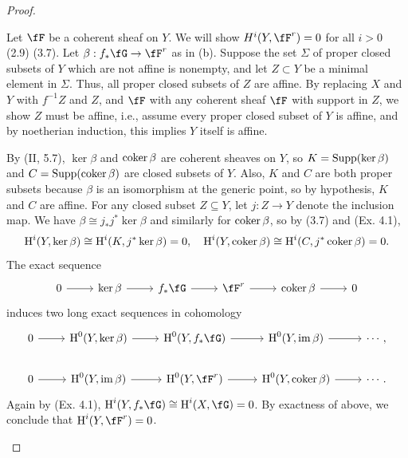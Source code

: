 \documentclass[a4paper]{article}
\begin{document}
\begin{enumerate} [label=\textbf{\arabic*.}, leftmargin=0em]
\begin{proof}
\begin{enumerate} [label=(\alph*), leftmargin=0cm]
                  Let $\fF$ be a coherent sheaf on $Y$.
                  We will show $H^i(Y, \fF^r) = 0$ for all $i > 0$ (2.9) (3.7).
                  Let $\beta : f_*\fG \to \fF^r$ as in (b).
                  Suppose the set $\Sigma$ of proper closed subsets of $Y$ which are not affine is nonempty, and let $Z \subset Y$ be a minimal element in $\Sigma$.
                  Thus, all proper closed subsets of $Z$ are affine.
                  By replacing $X$ and $Y$ with $f^{-1}Z$ and $Z$, and $\fF$ with any coherent sheaf $\fF$ with support in $Z$, we show $Z$ must be affine, i.e., assume every proper closed subset of $Y$ is affine, and by noetherian induction, this implies $Y$ itself is affine.

                  By (II, 5.7), $\ker{\beta}$ and $\operatorname{coker}{\beta}$ are coherent sheaves on $Y$, so $K = \operatorname{Supp}(\ker{\beta})$ and $C = \operatorname{Supp}(\operatorname{coker}{\beta})$ are closed subsets of $Y$.
                  Also, $K$ and $C$ are both proper subsets because $\beta$ is an isomorphism at the generic point, so by hypothesis, $K$ and $C$ are affine.
                  For any closed subset $Z \subseteq Y$, let $j : Z \to Y$ denote the inclusion map.
                  We have $\beta \cong j_*j^*\ker{\beta}$ and similarly for $\operatorname{coker}{\beta}$, so by (3.7) and (Ex. 4.1),
                  \begin{equation*}
                    \operatorname{H}^i(Y, \ker{\beta}) \cong \operatorname{H}^i(K, j^*\ker{\beta}) = 0, \quad \operatorname{H}^i(Y, \operatorname{coker}{\beta}) \cong \operatorname{H}^i(C, j^*\operatorname{coker}{\beta}) = 0.
                  \end{equation*}
                  The exact sequence
                  \[ \begin{tikzcd}
                      0 \arrow[r] & \ker{\beta} \arrow[r] & f_*\fG \arrow[r] & \fF^r \arrow[r] & \coker{\beta} \arrow[r] & 0
                    \end{tikzcd} \]
                  induces two long exact sequences in cohomology
                  \[ \begin{tikzcd}
                      0 \arrow[r] & {\cH^0(Y, \ker{\beta})} \arrow[r] & {\cH^0(Y, f_*\fG)} \arrow[r] & {\cH^0(Y, \im{\beta})} \arrow[r]    & \cdots, \\
                      0 \arrow[r] & {\cH^0(Y, \im{\beta})} \arrow[r]  & {\cH^0(Y, \fF^r)} \arrow[r]  & {\cH^0(Y, \coker{\beta})} \arrow[r] & \cdots.
                    \end{tikzcd} \]
                  Again by (Ex. 4.1), $\cH^i(Y, f_*\fG) \cong \cH^i(X, \fG) = 0$.
                  By exactness of above, we conclude that $\cH^i(Y, \fF^r) = 0$.
          \end{enumerate}
        \end{proof}


\end{enumerate}
\end{document}
